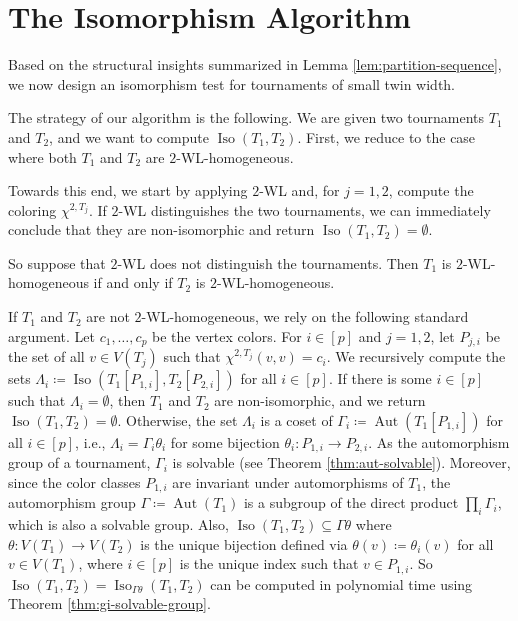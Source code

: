 \documentclass{theoretics}
\newcommand{\WL}[2]{\chi^{#1,#2}}
\DeclareMathOperator{\Aut}{Aut}
\DeclareMathOperator{\Iso}{Iso}
\begin{document}
\section{The Isomorphism Algorithm}
\label{sec:alg}

Based on the structural insights summarized in Lemma \ref{lem:partition-sequence}, we now design an isomorphism test for tournaments of small twin width.

The strategy of our algorithm is the following.
We are given two tournaments $T_1$ and $T_2$, and we want to compute $\Iso(T_1,T_2)$.
First, we reduce to the case where both $T_1$ and $T_2$ are $2$-WL-homogeneous.

Towards this end, we start by applying $2$-WL and, for $j=1,2$, compute the coloring $\WL{2}{T_j}$.
If $2$-WL distinguishes the two tournaments, we can immediately conclude that they are non-isomorphic and return $\Iso(T_1,T_2) = \emptyset$.

So suppose that $2$-WL does not distinguish the tournaments.
Then $T_1$ is $2$-WL-homogeneous if and only if $T_2$ is $2$-WL-homogeneous.

If $T_1$ and $T_2$ are not $2$-WL-homogeneous, we rely on the following standard argument.
Let $c_1,\ldots,c_p$ be the vertex colors.
For $i \in [p]$ and $j=1,2$, let $P_{j,i}$ be the set of all $v\in V(T_j)$ such that $\WL{2}{T_j}(v,v) = c_i$.
We recursively compute the sets $\Lambda_i \coloneqq \Iso(T_1[P_{1,i}],T_2[P_{2,i}])$ for all $i \in [p]$.
If there is some $i \in [p]$ such that $\Lambda_i = \emptyset$, then $T_1$ and $T_2$ are non-isomorphic, and we return $\Iso(T_1,T_2)=\emptyset$.
Otherwise, the set $\Lambda_i$ is a coset of $\Gamma_i \coloneqq \Aut(T_1[P_{1,i}])$ for all $i \in [p]$, i.e., $\Lambda_i = \Gamma_i\theta_i$ for some bijection $\theta_i\colon P_{1,i} \to P_{2,i}$.
As the automorphism group of a tournament, $\Gamma_i$ is solvable (see Theorem \ref{thm:aut-solvable}).
Moreover, since the color classes $P_{1,i}$ are invariant under automorphisms of $T_1$, the automorphism group $\Gamma \coloneqq \Aut(T_1)$ is a subgroup of the direct product $\prod_i \Gamma_{i}$, which is also a solvable group.
Also, $\Iso(T_1,T_2) \subseteq \Gamma\theta$ where $\theta\colon V(T_1) \to V(T_2)$ is the unique bijection defined via $\theta(v) \coloneqq \theta_i(v)$ for all $v \in V(T_1)$, where $i \in [p]$ is the unique index such that $v \in P_{1,i}$.
So $\Iso(T_1,T_2) = \Iso_{\Gamma\theta}(T_1,T_2)$ can be computed in polynomial time using Theorem \ref{thm:gi-solvable-group}.
\end{document}
